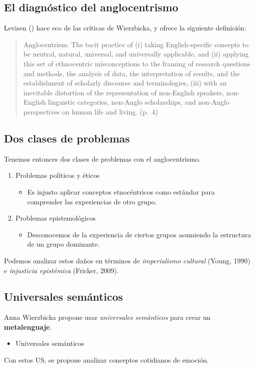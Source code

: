 \documentclass{article}
\providecommand{\tightlist}{%
  \setlength{\itemsep}{0pt}\setlength{\parskip}{0pt}}
\begin{document}
\subsection{El diagnóstico del
anglocentrismo}\label{el-diagnuxf3stico-del-anglocentrismo-1}

Levisen () hace eco de las críticas de Wierzbicka, y ofrece la siguiente
definición:

\begin{quote}
Anglocentrism: The tacit practice of (i) taking English-specific
concepts to be neutral, natural, universal, and universally applicable,
and (ii) applying this set of ethnocentric misconceptions to the framing
of research questions and methods, the analysis of data, the
interpretation of results, and the establishment of scholarly discourse
and terminologies, (iii) with an inevitable distortion of the
representation of non-English speakers, non-English linguistic
categories, non-Anglo scholarships, and non-Anglo perspectives on human
life and living. (p.~4)
\end{quote}

\subsection{Dos clases de problemas}\label{dos-clases-de-problemas}

Tenemos entonces dos clases de problemas con el anglocentrismo.

\begin{enumerate}
\def\labelenumi{\arabic{enumi}.}
\tightlist
\item
  Problemas políticos y éticos

  \begin{itemize}
  \tightlist
  \item
    Es injusto aplicar conceptos etnocéntricos como estándar para
    comprender las experiencias de otro grupo.
  \end{itemize}
\item
  Problemas epistemológicos

  \begin{itemize}
  \tightlist
  \item
    Desconocemos de la experiencia de ciertos grupos asumiendo la
    estructura de un grupo dominante.
  \end{itemize}
\end{enumerate}

Podemos analizar estos daños en términos de \emph{imperialismo cultural}
(Young, 1990) e \emph{injusticia epistémica} (Fricker, 2009).

\subsection{Universales semánticos}\label{universales-semuxe1nticos}

Anna Wierzbicka propone usar \emph{universales semánticos} para crear un
\textbf{metalenguaje}.

\begin{itemize}
\tightlist
\item
  Universales semánticos
\end{itemize}

Con estos US, se propone analizar conceptos cotidianos de emoción.
\end{document}

